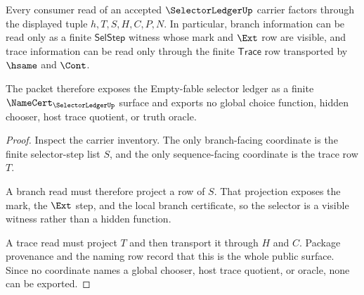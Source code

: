 \begin{theorem}
\label{thm:selector-ledger-no-hidden-choice}
Every consumer read of an accepted $\SelectorLedgerUp$ carrier factors through the displayed tuple $h,T,S,H,C,P,N$. In particular, branch information can be read only as a finite $\mathsf{SelStep}$ witness whose mark and $\Ext$ row are visible, and trace information can be read only through the finite $\mathsf{Trace}$ row transported by $\hsame$ and $\Cont$.

The packet therefore exposes the Empty-fable selector ledger as a finite $\NameCert_{\SelectorLedgerUp}$ surface and exports no global choice function, hidden chooser, host trace quotient, or truth oracle.
\end{theorem}
\begin{proof}
Inspect the carrier inventory. The only branch-facing coordinate is the finite selector-step list $S$, and the only sequence-facing coordinate is the trace row $T$.

A branch read must therefore project a row of $S$. That projection exposes the mark, the $\Ext$ step, and the local branch certificate, so the selector is a visible witness rather than a hidden function.

A trace read must project $T$ and then transport it through $H$ and $C$. Package provenance and the naming row record that this is the whole public surface. Since no coordinate names a global chooser, host trace quotient, or oracle, none can be exported.
\end{proof}

